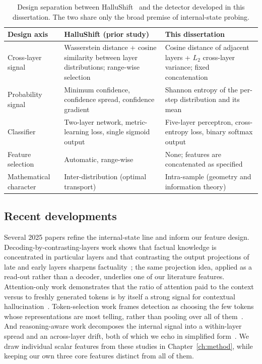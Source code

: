 \begin{table}[t]
\centering
\caption{Design separation between HalluShift~\cite{dasgupta2025hallushift} and the
detector developed in this dissertation. The two share only the broad premise of
internal-state probing.}
\label{tab:distinction}
\renewcommand{\arraystretch}{1.35}
\begin{tabularx}{\textwidth}{p{3.1cm} X X}
\toprule
\textbf{Design axis} & \textbf{HalluShift (prior study)} & \textbf{This dissertation} \\
\midrule
Cross-layer signal & Wasserstein distance + cosine similarity between layer
distributions; range-wise selection & Cosine distance of adjacent layers + $L_2$
cross-layer variance; fixed concatenation \\
Probability signal & Minimum confidence, confidence spread, confidence gradient &
Shannon entropy of the per-step distribution and its mean \\
Classifier & Two-layer network, metric-learning loss, single sigmoid output &
Five-layer perceptron, cross-entropy loss, binary softmax output \\
Feature selection & Automatic, range-wise & None; features are concatenated as
specified \\
Mathematical character & Inter-distribution (optimal transport) & Intra-sample
(geometry and information theory) \\
\bottomrule
\end{tabularx}
\end{table}

\subsection{Recent developments}

Several 2025 papers refine the internal-state line and inform our feature design.
Decoding-by-contrasting-layers work shows that factual knowledge is concentrated in
particular layers and that contrasting the output projections of late and early layers
sharpens factuality~\cite{chuang2024dola}; the same projection idea, applied as a
read-out rather than a decoder, underlies one of our literature features. Attention-only
work demonstrates that the ratio of attention paid to the context versus to freshly
generated tokens is by itself a strong signal for contextual
hallucination~\cite{chuang2024lookback}. Token-selection work frames detection as
choosing the few tokens whose representations are most telling, rather than pooling over
all of them~\cite{niu2025hami}. And reasoning-aware work decomposes the internal signal
into a within-layer spread and an across-layer drift, both of which we echo in simplified
form~\cite{d2hscore2025}. We draw individual scalar features from these studies in
Chapter~\ref{ch:method}, while keeping our own three core features distinct from all of
them.

